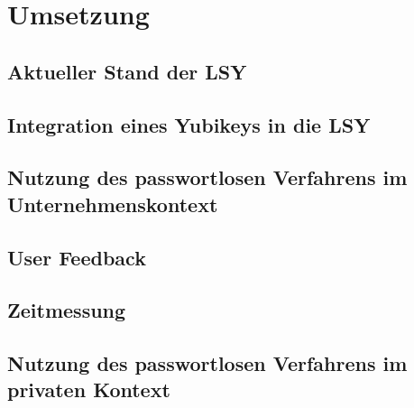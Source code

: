 \chapter{Umsetzung}

\section{Aktueller Stand der LSY}

\section{Integration eines Yubikeys in die LSY}

\section{Nutzung des passwortlosen Verfahrens im Unternehmenskontext}

\section{User Feedback}

\section{Zeitmessung}

\section{Nutzung des passwortlosen Verfahrens im privaten Kontext}